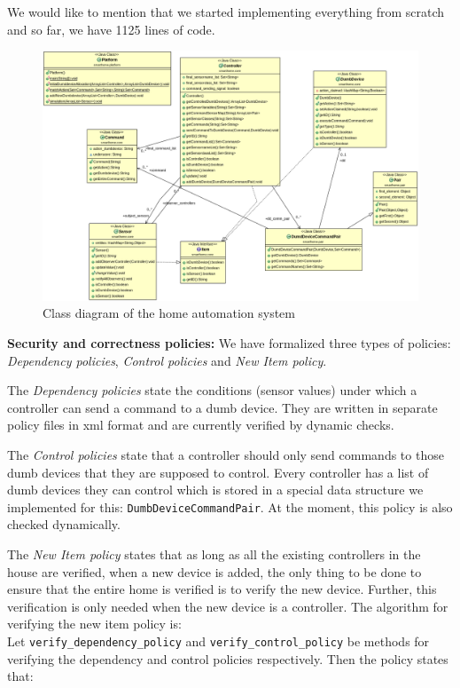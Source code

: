 \documentclass{article}
\begin{document}
We would like to mention that we started implementing everything from scratch and so far, we have 1125 lines of code. \\

\begin{figure}[h]
\includegraphics[scale=0.35, trim = 0 0 0 0]{classdiagram.png}
\caption{Class diagram of the home automation system}
\label{fig:classdia}
\end{figure}

\noindent \textbf{Security and correctness policies:} We have formalized three types of policies: \textit{Dependency policies}, \textit{Control policies} and \textit{New Item policy}. 

The \textit{Dependency policies} state the conditions (sensor values) under which a controller can send a command to a dumb device. They are written in separate policy files in xml format
and are currently verified by dynamic checks. 

The \textit{Control policies} state that a controller should only send commands to those dumb devices that they are supposed to control. Every controller has a list of dumb devices they can control which is stored in a special data structure we implemented for this: \texttt{DumbDeviceCommandPair}. At the moment, this policy is also checked dynamically.

The \textit{New Item policy} states that as long as all the existing controllers in the house are verified, when a new device is added, the only thing to be done to ensure that the entire home is verified is to verify the new device. Further, this verification is only needed when the new device is a controller. 
The algorithm for verifying the new item policy is:\\
\noindent Let \texttt{verify\_dependency\_policy} and \texttt{verify\_control\_policy} be methods for verifying the dependency and control policies respectively.
Then the policy states that: \\
\end{document}

